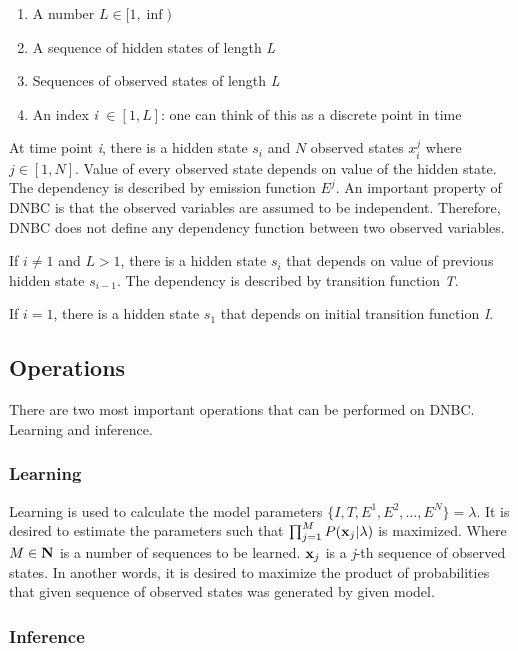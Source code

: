 \documentclass[thesis=B,english]{FITthesis}[2012/06/26]
\begin{document}
\begin{enumerate}

\item A number $L \in [1, \inf)$
\item A sequence of hidden states of length \emph{L}
\item Sequences of observed states of length \emph{L}
\item An index \emph{i} $\in [1, L]$: one can think of this as a discrete point in time

\end{enumerate}

At time point \emph{i}, there is a hidden state $s_i$ and $N$ observed states $x^j_i$ where $j \in [1,N]$. Value of every observed state depends on value of the hidden state. The dependency is described by emission function $E^j$. An important property of DNBC is that the observed variables are assumed to be independent. Therefore, DNBC does not define any dependency function between two observed variables.

If $i \neq 1$ and $L > 1$, there is a hidden state $s_i$ that depends on value of previous hidden state $s_{i-1}$. The dependency is described by transition function \emph{T}.

If $i = 1$, there is a hidden state $s_1$ that depends on initial transition function \emph{I}.

\subsection{Operations}

There are two most important operations that can be performed on DNBC. Learning and inference.

\subsubsection{Learning}

Learning is used to calculate the model parameters $\{I,T,E^1,E^2,\dots,E^N\} = \lambda$. It is desired to estimate the parameters such that $\prod_{j=1}^{M} P(\textbf x_j | \lambda )$ is maximized. Where $M \in \textbf N$ is a number of sequences to be learned. $\textbf x_j$ is a \emph{j}-th sequence of observed states. In another words, it is desired to maximize the product of probabilities that given sequence of observed states was generated by given model.

\subsubsection{Inference}
\end{document}
